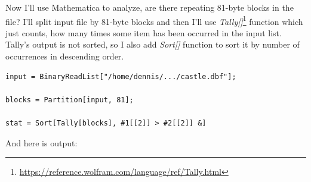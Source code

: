 Now I'll use Mathematica to analyze, are there repeating 81-byte blocks in the file?
I'll split input file by 81-byte blocks and then I'll use 
\emph{Tally[]}\footnote{\url{https://reference.wolfram.com/language/ref/Tally.html}}
function which just counts, how many times some item has been occurred in the input list.
Tally's output is not sorted, so I also add \emph{Sort[]} function to sort it by number of occurrences in descending order.

\begin{lstlisting}[style=custommath]
input = BinaryReadList["/home/dennis/.../castle.dbf"];

blocks = Partition[input, 81];

stat = Sort[Tally[blocks], #1[[2]] > #2[[2]] &]
\end{lstlisting}

And here is output:

